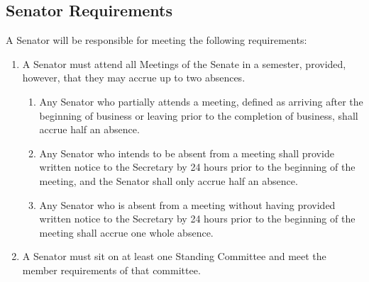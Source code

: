 \documentclass[12pt]{scrreprt}
\begin{document}
\subsection{Senator Requirements}
A Senator will be responsible for meeting the following requirements:
\begin{enumerate}
    \item A Senator must attend all Meetings of the Senate in a semester, provided, however, that they may accrue up to two absences.
    \begin{enumerate}
        \item Any Senator who partially attends a meeting, defined as arriving after the beginning of business or leaving prior to the completion of business, shall accrue half an absence.
        \item Any Senator who intends to be absent from a meeting shall provide written notice to the Secretary by 24 hours prior to the beginning of the meeting, and the Senator shall only accrue half an absence.
        \item Any Senator who is absent from a meeting without having provided written notice to the Secretary by 24 hours prior to the beginning of the meeting shall accrue one whole absence.
    \end{enumerate}
    \item A Senator must sit on at least one Standing Committee and meet the member requirements of that committee.
  

\end{enumerate}
\end{document}
